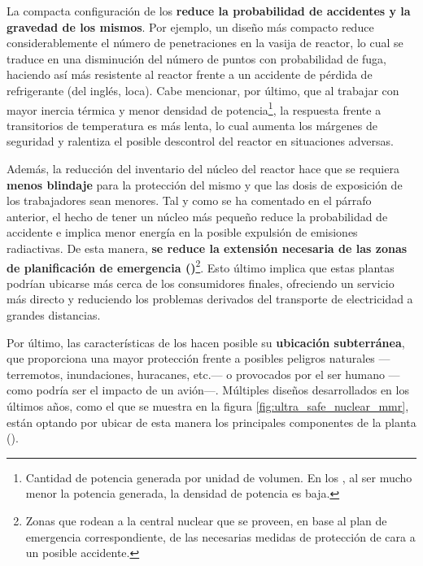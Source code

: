 La compacta configuración de los  \textbf{reduce la probabilidad de accidentes y la gravedad de los mismos}. Por ejemplo, un diseño más compacto reduce considerablemente el número de penetraciones en la vasija de reactor, lo cual se traduce en una disminución del número de puntos con probabilidad de fuga, haciendo así más resistente al reactor frente a un accidente de pérdida de refrigerante (del inglés, \acrshort{loca}). Cabe mencionar, por último, que al trabajar con mayor inercia térmica y menor densidad de potencia\footnote{Cantidad de potencia generada por unidad de volumen. En los , al ser mucho menor la potencia generada, la densidad de potencia es baja.}, la respuesta frente a transitorios de temperatura es más lenta, lo cual aumenta los márgenes de seguridad y ralentiza el posible descontrol del reactor en situaciones adversas.

Además, la reducción del inventario del núcleo del reactor hace que se requiera \textbf{menos blindaje} para la protección del mismo y que las dosis de exposición de los trabajadores sean menores. Tal y como se ha comentado en el párrafo anterior, el hecho de tener un núcleo más pequeño reduce la probabilidad de accidente e implica menor energía en la posible expulsión de emisiones radiactivas. De esta manera, \textbf{se reduce la extensión necesaria de las zonas de planificación de emergencia ()}\footnote{Zonas que rodean a la central nuclear que se proveen, en base al plan de emergencia correspondiente, de las necesarias medidas de protección de cara a un posible accidente.}. Esto último implica que estas plantas podrían ubicarse más cerca de los consumidores finales, ofreciendo un servicio más directo y reduciendo los problemas derivados del transporte de electricidad a grandes distancias.

Por último, las características de los  hacen posible su \textbf{ubicación subterránea}, que proporciona una mayor protección frente a posibles peligros naturales ---terremotos, inundaciones, huracanes, etc.--- o provocados por el ser humano ---como podría ser el impacto de un avión---. Múltiples diseños desarrollados en los últimos años, como el que se muestra en la figura \ref{fig:ultra_safe_nuclear_mmr}, están optando por ubicar de esta manera los principales componentes de la planta (\cite{nea_smrs_2021}).

